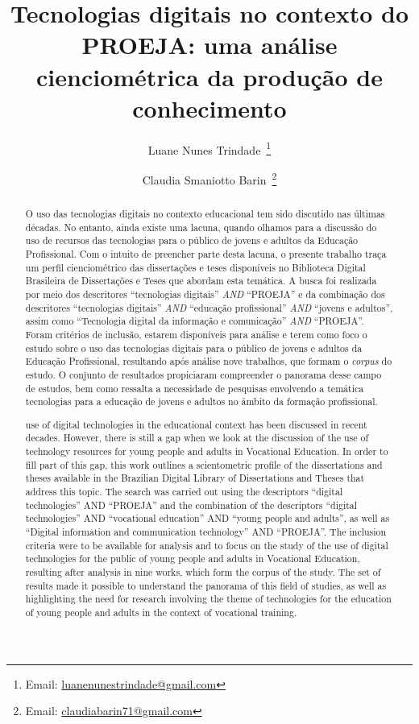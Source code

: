 \documentclass[portuguese]{textolivre}
\title{Tecnologias digitais no contexto do PROEJA: uma análise cienciométrica da produção de conhecimento}
\author[1]{Luane Nunes Trindade~\orcid{0009-0002-8760-1628}\thanks{Email: \href{mailto:luanenunestrindade@gmail.com}{luanenunestrindade@gmail.com}}}
\author[2]{Claudia Smaniotto Barin~\orcid{0000-0002-6549-5476}\thanks{Email: \href{mailto:claudiabarin71@gmail.com}{claudiabarin71@gmail.com}}}
\affil[1]{Universidade Federal de Santa Maria, Programa de Pós-graduação em Educação Profissional e Tecnológica, Santa Maria, RS, Brasil.}
\affil[2]{Universidade Federal de Santa Maria, Departamento de Química, Santa Maria, RS, Brasil.}
\begin{document}
\maketitle
\begin{polyabstract}
\begin{abstract}
O uso das tecnologias digitais no contexto educacional
tem sido discutido nas últimas décadas. No entanto, ainda existe uma
lacuna, quando olhamos para a discussão do uso de recursos das
tecnologias para o público de jovens e adultos da Educação Profissional.
Com o intuito de preencher parte desta lacuna, o presente trabalho traça
um perfil cienciométrico das dissertações e teses disponíveis no
Biblioteca Digital Brasileira de Dissertações e Teses que abordam esta
temática. A busca foi realizada por meio dos descritores ``tecnologias
digitais'' \emph{AND} ``PROEJA'' e da combinação dos descritores
``tecnologias digitais'' \emph{AND} ``educação profissional'' \emph{AND}
``jovens e adultos'', assim como ``Tecnologia digital da informação e
comunicação'' \emph{AND} ``PROEJA''. Foram critérios de inclusão,
estarem disponíveis para análise e terem como foco o estudo sobre o uso
das tecnologias digitais para o público de jovens e adultos da Educação
Profissional, resultando após análise nove trabalhos, que formam o
\emph{corpus} do estudo. O conjunto de resultados propiciaram
compreender o panorama desse campo de estudos, bem como ressalta a
necessidade de pesquisas envolvendo a temática tecnologias para a
educação de jovens e adultos no âmbito da formação profissional.

\end{abstract}

\begin{english}
\begin{abstract}
use of digital technologies in the educational
context has been discussed in recent decades. However, there is still a
gap when we look at the discussion of the use of technology resources
for young people and adults in Vocational Education. In order to fill
part of this gap, this work outlines a scientometric profile of the
dissertations and theses available in the Brazilian Digital Library of
Dissertations and Theses that address this topic. The search was carried
out using the descriptors ``digital technologies'' AND ``PROEJA'' and
the combination of the descriptors ``digital technologies'' AND
``vocational education'' AND ``young people and adults'', as well as
``Digital information and communication technology'' AND ``PROEJA''. The
inclusion criteria were to be available for analysis and to focus on the
study of the use of digital technologies for the public of young people
and adults in Vocational Education, resulting after analysis in nine
works, which form the corpus of the study. The set of results made it
possible to understand the panorama of this field of studies, as well as
highlighting the need for research involving the theme of technologies
for the education of young people and adults in the context of
vocational training.




\end{abstract}
\end{english}
\end{polyabstract}
\end{document}
